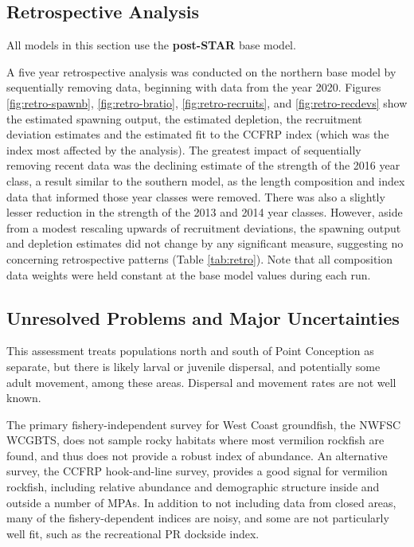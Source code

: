 \documentclass[11pt,
  english,
]{article}
\begin{document}

\hypertarget{retrospective-analysis}{%
\subsection{Retrospective Analysis}\label{retrospective-analysis}}

\leavevmode\tagmcend\tagstructend

All models in this section use the \textbf{post-STAR} base model.

A five year retrospective analysis was conducted on the northern base model by sequentially removing data, beginning with data from the year 2020. Figures \ref{fig:retro-spawnb}, \ref{fig:retro-bratio}, \ref{fig:retro-recruits}, and \ref{fig:retro-recdevs} show the estimated spawning output, the estimated depletion, the recruitment deviation estimates and the estimated fit to the CCFRP index (which was the index most affected by the analysis). The greatest impact of sequentially removing recent data was the declining estimate of the strength of the 2016 year class, a result similar to the southern model, as the length composition and index data that informed those year classes were removed. There was also a slightly lesser reduction in the strength of the 2013 and 2014 year classes. However, aside from a modest rescaling upwards of recruitment deviations, the spawning output and depletion estimates did not change by any significant measure, suggesting no concerning retrospective patterns (Table \ref{tab:retro}). Note that all composition data weights were held constant at the base model values during each run.


\hypertarget{unresolved-problems-and-major-uncertainties-1}{%
\subsection{Unresolved Problems and Major Uncertainties}\label{unresolved-problems-and-major-uncertainties-1}}

\leavevmode\tagmcend\tagstructend

This assessment treats populations north and south of Point Conception as separate, but there is likely larval or juvenile dispersal, and potentially some adult movement, among these areas. Dispersal and movement rates are not well known.

The primary fishery-independent survey for West Coast groundfish, the NWFSC WCGBTS, does not sample rocky habitats where most vermilion rockfish are found, and thus does not provide a robust index of abundance. An alternative survey, the CCFRP hook-and-line survey, provides a good signal for vermilion rockfish, including relative abundance and demographic structure inside and outside a number of MPAs. In addition to not including data from closed areas, many of the fishery-dependent indices are noisy, and some are not particularly well fit, such as the recreational PR dockside index.
\end{document}
